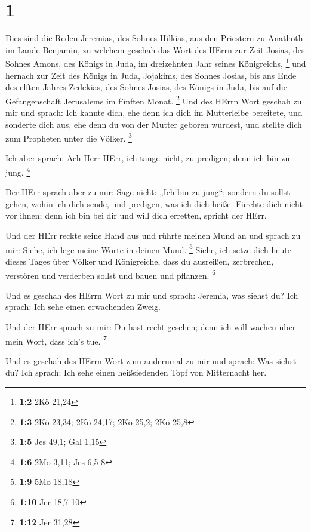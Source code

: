 \hypertarget{section}{%
\section{1}\label{section}}

 Dies sind die Reden Jeremias, des Sohnes Hilkias, aus den
Priestern zu Anathoth im Lande Benjamin,  zu welchem geschah
das Wort des HErrn zur Zeit Josias, des Sohnes Amons, des Königs in
Juda, im dreizehnten Jahr seines Königreichs, \footnote{\textbf{1:2} 2Kö
  21,24}  und hernach zur Zeit des Königs in Juda, Jojakims,
des Sohnes Josias, bis ans Ende des elften Jahres Zedekias, des Sohnes
Josias, des Königs in Juda, bis auf die Gefangenschaft Jerusalems im
fünften Monat. \footnote{\textbf{1:3} 2Kö 23,34; 2Kö 24,17; 2Kö 25,2;
  2Kö 25,8}  Und des HErrn Wort geschah zu mir und sprach:
 Ich kannte dich, ehe denn ich dich im Mutterleibe
bereitete, und sonderte dich aus, ehe denn du von der Mutter geboren
wurdest, und stellte dich zum Propheten unter die Völker. \footnote{\textbf{1:5}
  Jes 49,1; Gal 1,15}

 Ich aber sprach: Ach Herr HErr, ich tauge nicht, zu
predigen; denn ich bin zu jung. \footnote{\textbf{1:6} 2Mo 3,11; Jes
  6,5-8}

 Der HErr sprach aber zu mir: Sage nicht: „Ich bin zu
jung``; sondern du sollst gehen, wohin ich dich sende, und predigen, was
ich dich heiße.  Fürchte dich nicht vor ihnen; denn ich bin
bei dir und will dich erretten, spricht der HErr.

 Und der HErr reckte seine Hand aus und rührte meinen Mund
an und sprach zu mir: Siehe, ich lege meine Worte in deinen Mund.
\footnote{\textbf{1:9} 5Mo 18,18}  Siehe, ich setze dich
heute dieses Tages über Völker und Königreiche, dass du ausreißen,
zerbrechen, verstören und verderben sollst und bauen und pflanzen.
\footnote{\textbf{1:10} Jer 18,7-10}

 Und es geschah des HErrn Wort zu mir und sprach: Jeremia,
was siehst du? Ich sprach: Ich sehe einen erwachenden Zweig.

 Und der HErr sprach zu mir: Du hast recht gesehen; denn
ich will wachen über mein Wort, dass ich's tue. \footnote{\textbf{1:12}
  Jer 31,28}

 Und es geschah des HErrn Wort zum andernmal zu mir und
sprach: Was siehst du? Ich sprach: Ich sehe einen heißsiedenden Topf von
Mitternacht her.

